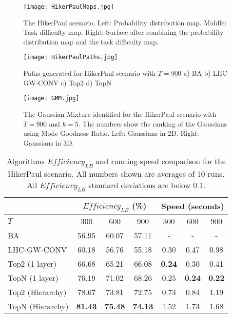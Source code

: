 \begin{figure}[!ht]
\centering
\texttt{[image: HikerPaulMaps.jpg]}
\caption{The HikerPaul scenario. Left: Probability distribution map. Middle: Task difficulty map. Right: Surface after combining the probability distribution map and the task difficulty map.}
\label{HikerPaulMaps}
\end{figure}
\begin{figure}[!ht]
\centering
\texttt{[image: HikerPaulPaths.jpg]}
\caption{Paths generated for HikerPaul scenario with $T=900$ a) BA b) LHC-GW-CONV c) Top2 d) TopN}
\label{HikerPaulPaths}
\end{figure}
\begin{figure}[!ht]
\centering
\texttt{[image: GMM.jpg]}
\caption{The Gaussian Mixture identified for the HikerPaul scenario with $T=900$ and $k=5$. The numbers show the ranking of the Gaussians using Mode Goodness Ratio. Left: Gaussians in 2D. Right: Gaussians in 3D.}
\label{GMMRanking}
\end{figure}
\begin{table}[!ht]
\caption{Algorithms $\mathit{Efficiency_{LB}}$ and running speed comparison for the HikerPaul scenario. All numbers shown are averages of 10 runs. All $\mathit{Efficiency_{LB}}$ standard deviations are below 0.1.}
	\centering
		\begin{tabular}
			{|l|c|c|c|c|c|c|}
			\hline
			 & \multicolumn{3}{|c|}{$\mathit{Efficiency_{LB}}$ (\%)} & \multicolumn{3}{|c|}{Speed (seconds)} \\
			\hline
			$T$ & 300 & 600 & 900	& 300 & 600 & 900 \\
			\hline
			BA & 56.95 & 60.07 & 57.11 & - & - & - \\
			\hline			
			LHC-GW-CONV & 60.18 & 56.76 & 55.18 & 0.30 & 0.47 & 0.98 \\
			\hline			
			Top2 (1 layer)	& 66.68 & 65.21 & 66.08 & \textbf{0.24} & 0.30 & 0.41 \\ 
			\hline
			TopN (1 layer)	& 76.19 & 71.02 & 68.26 & 0.25 & \textbf{0.24} & \textbf{0.22} \\ 
			\hline
			Top2 (Hierarchy) & 78.67 & 73.81 & 72.75 & 0.73 & 0.84 & 1.19 \\ 
			\hline
			TopN (Hierarchy) & \textbf{81.43} & \textbf{75.48} & \textbf{74.13} & 1.52 & 1.73 & 1.68 \\ 
			\hline			
		\end{tabular}
\label{HikerPaul}
\end{table}

